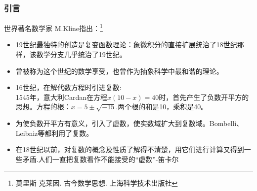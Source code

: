 \documentclass{beamer}
\begin{document}



\begin{frame}[t]
\frametitle{引言}
\begin{block}{世界著名数学家 M.Kline指出：\footnote{\color{white}莫里斯 \quad 克莱因. 古今数学思想. \quad 上海科学技术出版社}}
\begin{itemize}
\item 19世纪最独特的创造是复变函数理论：象微积分的直接扩展统治了18世纪那样，该数学分支几乎统治了19世纪。
\item
    曾被称为这个世纪的数学享受，也曾作为抽象科学中最和谐的理论。
\end{itemize}

\end{block}

\begin{itemize}
\item
    16世纪，在解代数方程时引进复数:\\
     1545年，意大利Cardan在方程$x(10-x) = 40$时，首先产生了负数开平方的思想。方程的根：$x = 5 \pm \sqrt{-15}$.两个根的和是10，乘积是40。
\item
为使负数开平方有意义，引入了虚数，使实数域扩大到复数域。Bombelli、Leibniz等都利用了复数。
\item
在18世纪以前，对复数的概念及性质了解得不清楚，用它们进行计算又得到一些矛盾.人们一直把复数看作不能接受的“虚数”-笛卡尔

\end{itemize}
\end{frame}
%
%
%
%
\end{document}
